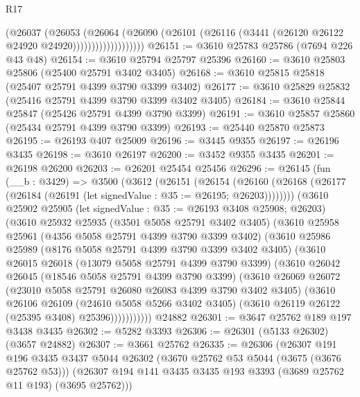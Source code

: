 \begin{lexlean}{R17}
\begin{coremodule}
                          (@26037
                            (@26053
                              (@26064
                                (@26090
                                  (@26101
                                    (@26116 (@3441 (@26120 @26122 @24920 @24920)))))))))))))))))))
@26151 := @3610 @25783 @25786 (@7694 @226 @43 @48)
@26154 := @3610 @25794 @25797 @25396
@26160 := @3610 @25803 @25806 (@25400 @25791 @3402 @3405)
@26168 := @3610 @25815 @25818 (@25407 @25791 @4399 @3790 @3399 @3402)
@26177 := @3610 @25829 @25832 (@25416 @25791 @4399 @3790 @3399 @3402 @3405)
@26184 := @3610 @25844 @25847 (@25426 @25791 @4399 @3790 @3399)
@26191 := @3610 @25857 @25860 (@25434 @25791 @4399 @3790 @3399)
@26193 := @25440 @25870 @25873
@26195 := @26193 @407 @25009
@26196 := @3445 @9355
@26197 := @26196 @3435
@26198 := @3610 @26197
@26200 := @3452 @9355 @3435
@26201 := @26198 @26200
@26203 := @26201 @25454 @25456
@26296 := @26145
    (fun (__b : @3429) =>
    @3500
      (@3612
        (@26151
          (@26154
            (@26160 (@26168 (@26177 (@26184 (@26191 (let signedValue : @35 := @26195; @26203))))))))
        (@3610
          @25902
          @25905
          (let signedValue : @35 := @26193 @3408 @25908; @26203)
          (@3610
            @25932
            @25935
            (@3501 @5058 @25791 @3402 @3405)
            (@3610
              @25958
              @25961
              (@4356 @5058 @25791 @4399 @3790 @3399 @3402)
              (@3610
                @25986
                @25989
                (@8176 @5058 @25791 @4399 @3790 @3399 @3402 @3405)
                (@3610
                  @26015
                  @26018
                  (@13079 @5058 @25791 @4399 @3790 @3399)
                  (@3610
                    @26042
                    @26045
                    (@18546 @5058 @25791 @4399 @3790 @3399)
                    (@3610
                      @26069
                      @26072
                      (@23010 @5058 @25791 @26080 @26083 @4399 @3790 @3402 @3405)
                      (@3610
                        @26106
                        @26109
                        (@24610 @5058 @5266 @3402 @3405)
                        (@3610 @26119 @26122 (@25395 @3408) @25396)))))))))))
    @24882
@26301 := @3647 @25762 @189 @197 @3438 @3435
@26302 := @5282 @3393
@26306 := @26301 (@5133 @26302) (@3657 @24882)
@26307 := @3661 @25762
@26335 := @26306
    (@26307
      @191
      @196
      @3435
      @3437
      @5044
      @26302
      (@3670 @25762 @53 @5044 (@3675 (@3676 @25762 @53)))
      (@26307 @194 @141 @3435 @3435 @193 @3393 (@3689 @25762 @11 @193) (@3695 @25762)))

\end{coremodule}
\end{lexlean}

